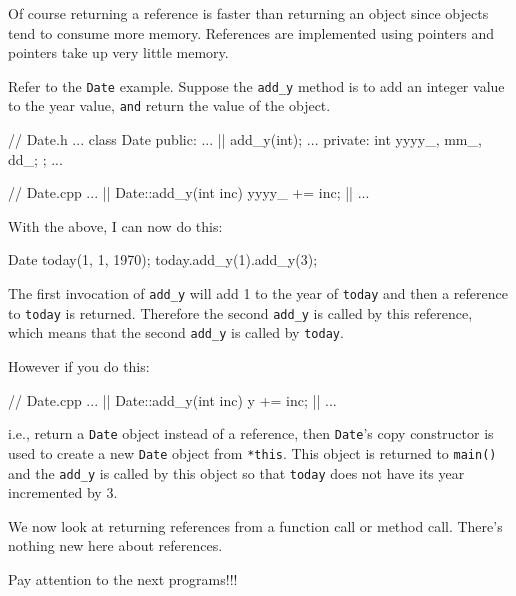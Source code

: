 Of course returning a reference is faster than returning an object since
objects tend to consume more memory. References are implemented using
pointers and pointers take up very little memory.

Refer to the \texttt{Date} example. Suppose the \texttt{add\_y} method is to
add an integer value to the year value, \texttt{and} return the value of
the object.

\begin{consolethree}[escapeinside=||]
// Date.h
...
class Date
{
public:
    ...
    || add_y(int);
    ...
private:
    int yyyy_, mm_, dd_;
};
...
\end{consolethree}

\begin{consolethree}[escapeinside=||]
// Date.cpp
...
|| Date::add_y(int inc)
{
    yyyy_ += inc;
    ||
}
...
\end{consolethree}

With the above, I can now do this:

\begin{consolethree}[escapeinside=||]
Date today(1, 1, 1970);
today.add_y(1).add_y(3);
\end{consolethree}

The first invocation of \texttt{add\_y} will add 1 to the year of
\texttt{today} and then a reference to \texttt{today} is returned. Therefore
the second \texttt{add\_y} is called by this reference, which means that
the second \texttt{add\_y} is called by \texttt{today}.

However if you do this:

\begin{consolethree}[escapeinside=||]
// Date.cpp
...
|| Date::add_y(int inc)
{
    y += inc;
    ||
}
...
\end{consolethree}

i.e., return a \texttt{Date} object instead of a reference, then
\texttt{Date}'s copy constructor is used to create a new
\texttt{Date} object from \texttt{*this}. This object is returned to
\texttt{main()} and the \texttt{add\_y} is called by this object so that
\texttt{today} does not have its year incremented by 3.

We now look at returning references from a function call or method call.
There's nothing new here about references.

 Pay attention to the next programs!!!

